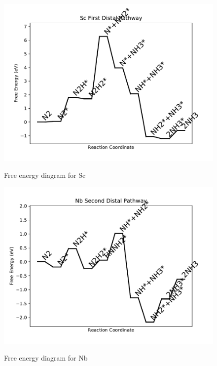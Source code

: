 \documentclass{article}
\begin{document}
\begin{figure}
\includegraphics[width=1\linewidth]{data/plots/Sc_distal_1.pdf}
\label{fig:Sc_distal_1}
\caption{Free energy diagram for Sc}
\end{figure}

\begin{figure}
\includegraphics[width=1\linewidth]{data/plots/Nb_distal_2.pdf}
\label{fig:Nb_distal_2}
\caption{Free energy diagram for Nb}
\end{figure}
\end{document}

